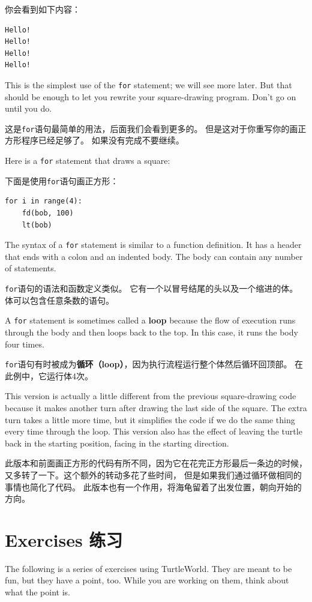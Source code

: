 \documentclass[10pt]{book}
\begin{document}
\begin{CJK}{UTF8}{gbsn}
你会看到如下内容：

\begin{verbatim}
Hello!
Hello!
Hello!
Hello!
\end{verbatim}
%
This is the simplest use of the {\tt for} statement; we will see
more later.  But that should be enough to let you rewrite your
square-drawing program.  Don't go on until you do.

这是{\tt for}语句最简单的用法，后面我们会看到更多的。
但是这对于你重写你的画正方形程序已经足够了。
如果没有完成不要继续。

Here is a {\tt for} statement that draws a square:

下面是使用{\tt for}语句画正方形：

\begin{verbatim}
for i in range(4):
    fd(bob, 100)
    lt(bob)
\end{verbatim}
%
The syntax of a {\tt for} statement is similar to a function
definition.  It has a header that ends with a colon and an indented
body.  The body can contain any number of statements.

{\tt for}语句的语法和函数定义类似。
它有一个以冒号结尾的头以及一个缩进的体。
体可以包含任意条数的语句。

A {\tt for} statement is sometimes called a {\bf loop} because
the flow of execution runs through the body and then loops back
to the top.  In this case, it runs the body four times.

{\tt for}语句有时被成为{\bf 循环（loop）}，因为执行流程运行整个体然后循环回顶部。
在此例中，它运行体4次。

This version is actually a little different from the previous
square-drawing code because it makes another turn after
drawing the last side of the square.  The extra turn takes a little
more time, but it simplifies the code if we do the same thing
every time through the loop.  This version also has the effect
of leaving the turtle back in the starting position, facing in
the starting direction.

此版本和前面画正方形的代码有所不同，因为它在花完正方形最后一条边的时候，
又多转了一下。这个额外的转动多花了些时间，
但是如果我们通过循环做相同的事情也简化了代码。
此版本也有一个作用，将海龟留着了出发位置，朝向开始的方向。

\section{Exercises 练习}

The following is a series of exercises using TurtleWorld.  They
are meant to be fun, but they have a point, too.  While you are
working on them, think about what the point is.


\end{CJK}
\end{document}
